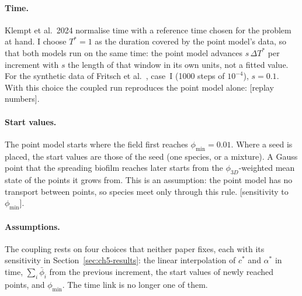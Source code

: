 \paragraph{Time.}
Klempt et al.\ 2024 normalise time with a reference time chosen for the problem at hand. I choose
$T^*=1$ as the duration covered by the point model's data, so that both models run on the same
time: the point model advances $s\,\Delta T^*$ per increment with $s$ the length of that window in
its own units, not a fitted value. For the synthetic data of Fritsch et al.\
\cite{Fritsch2025BayesianMicrofilms}, case~I (1000 steps of $10^{-4}$), $s=0.1$. With this choice
the coupled run reproduces the point model alone: [replay numbers].

\paragraph{Start values.}
The point model starts where the field first reaches $\phi_{\min}=0.01$. Where a seed is placed,
the start values are those of the seed (one species, or a mixture). A Gauss point that the
spreading biofilm reaches later starts from the $\phi_{3D}$-weighted mean state of the points it
grows from. This is an assumption: the point model has no transport between points, so species
meet only through this rule. [sensitivity to $\phi_{\min}$].

\paragraph{Assumptions.} The coupling rests on four choices that neither paper fixes, each
with its sensitivity in Section~\ref{sec:ch5-results}: the linear interpolation of $c^*$ and
$\alpha^*$ in time, $\sum_i\bar\phi_i$ from the previous increment, the start values of newly reached points,
and $\phi_{\min}$. The time link is no longer one of them.
